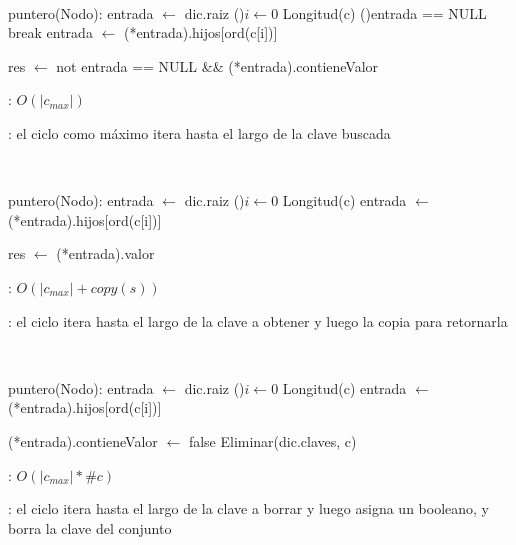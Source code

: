 \begin{Algoritmos}
	~

	\begin{algorithm}[H]
		\NoCaptionOfAlgo
		\caption{}
		puntero(Nodo): entrada $\leftarrow$ dic.raiz
		\For(){$i \leftarrow 0$ \KwTo Longitud(c)}{
			\lIf(){entrada == NULL} {break}
			entrada $\leftarrow$ (*entrada).hijos[ord(c[i])]
		}

		res $\leftarrow$ not entrada == NULL \&\& (*entrada).contieneValor
	\end{algorithm}

	\complejidad: $O(|c_{max}|)$

	\justifcomp: el ciclo como máximo itera hasta el largo de la clave buscada

	~

	\begin{algorithm}[H]
		\NoCaptionOfAlgo
		\caption{}
		puntero(Nodo): entrada $\leftarrow$ dic.raiz
		\For(){$i \leftarrow 0$ \KwTo Longitud(c)}{
			entrada $\leftarrow$ (*entrada).hijos[ord(c[i])]
		}

		res $\leftarrow$ (*entrada).valor
	\end{algorithm}

	\complejidad: $O(|c_{max}| + copy(s))$

	\justifcomp: el ciclo itera hasta el largo de la clave a obtener y luego la copia para retornarla

	~

	\begin{algorithm}[H]
		\NoCaptionOfAlgo
		\caption{}
		puntero(Nodo): entrada $\leftarrow$ dic.raiz
		\For(){$i \leftarrow 0$ \KwTo Longitud(c)}{
			entrada $\leftarrow$ (*entrada).hijos[ord(c[i])]
		}

		(*entrada).contieneValor $\leftarrow$ false
		Eliminar(dic.claves, c)
	\end{algorithm}

	\complejidad: $O(|c_{max}| * \#c)$

	\justifcomp: el ciclo itera hasta el largo de la clave a borrar y luego asigna un booleano, y borra la clave del conjunto


\end{Algoritmos}
